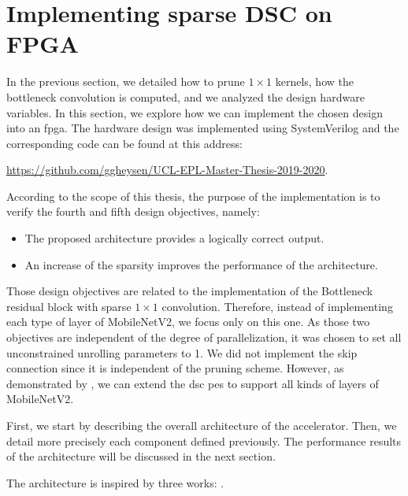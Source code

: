 \section{Implementing sparse DSC on FPGA} \label{sec:implementation}
In the previous section, we detailed how to prune $1 \times 1$ kernels, how the bottleneck convolution is computed, and we analyzed the design hardware variables. In this section, we explore how we can implement the chosen design into an \acrshort{fpga}. The hardware design was implemented using SystemVerilog and the corresponding code can be found at this address: 
%
\begin{center}
    \url{https://github.com/ggheysen/UCL-EPL-Master-Thesis-2019-2020}.
\end{center}
%
According to the scope of this thesis, the purpose of the implementation is to verify the fourth and fifth design objectives, namely:
%
\begin{itemize}
    \item The proposed architecture provides a logically correct output.
    \item An increase of the sparsity improves the performance of the architecture.
\end{itemize}
%
Those design objectives are related to the implementation of the Bottleneck residual block with sparse $1 \times 1$ convolution. Therefore, instead of implementing each type of layer of MobileNetV2, we focus only on this one. As those two objectives are independent of the degree of parallelization, it was chosen to set all unconstrained unrolling parameters to 1. We did not implement the skip connection since it is independent of the pruning scheme. However, as demonstrated by \textcite{bai_cnn_2018, liu_fpga-based_2019}, we can extend the \acrshort{dsc} \acrshort{pe}s to support all kinds of layers of MobileNetV2. 

First, we start by describing the overall architecture of the accelerator. Then, we detail more precisely each component defined previously. The performance results of the architecture will be discussed in the next section.

The architecture is inspired by three works: \textcite{zhu_efficient_2020, bai_cnn_2018, kang_accelerator-aware_2020,}.
%
